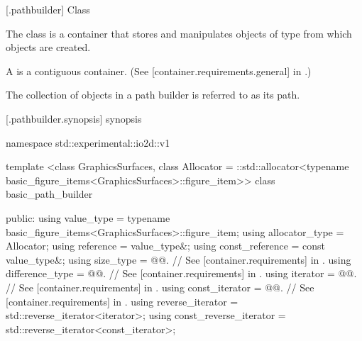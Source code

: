  [\iotwod.pathbuilder] {Class }

\pnum
{}%
The class  is a container that stores and manipulates objects of type  from which  objects are created.

\pnum
A  is a contiguous container. (See [container.requirements.general] in \CppXVII.)

\pnum
The collection of  objects in a path builder is referred to as its path.

 [\iotwod.pathbuilder.synopsis] { synopsis}%

\begin{codeblock}
namespace std::experimental::io2d::v1 {
  template <class GraphicsSurfaces,
            class Allocator = ::std::allocator<typename
              basic_figure_items<GraphicsSurfaces>::figure_item>>
  class basic_path_builder {
  public:
    using value_type             = typename basic_figure_items<GraphicsSurfaces>::figure_item;
    using allocator_type         = Allocator;
    using reference              = value_type&;
    using const_reference        = const value_type&;
    using size_type              = @@. // See [container.requirements] in \CppXVII.
    using difference_type        = @@. // See [container.requirements] in \CppXVII.
    using iterator               = @@. // See [container.requirements] in \CppXVII.
    using const_iterator         = @@. // See [container.requirements] in \CppXVII.
    using reverse_iterator       = std::reverse_iterator<iterator>;
    using const_reverse_iterator = std::reverse_iterator<const_iterator>;

}}
\end{codeblock}
